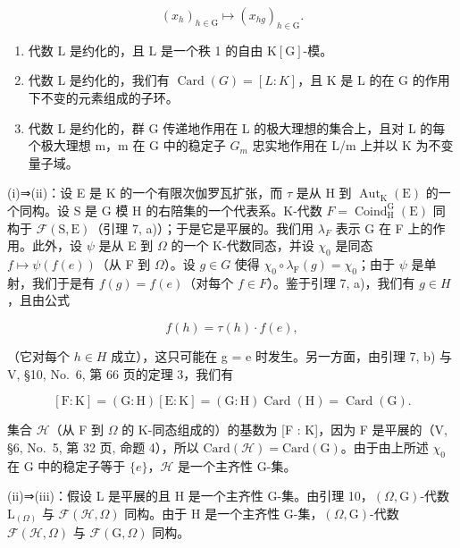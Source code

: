 \[
(x _ {h}) _ {h \in \mathrm{G}} \longmapsto (x _ {h g}) _ {h \in \mathrm{G}}.
\]

\begin{enumerate}
\def\labelenumi{(\roman{enumi})}
\setcounter{enumi}{3}
\item
  代数 \(\mathrm{L}\) 是约化的，且 \(\mathrm{L}\) 是一个秩 1 的自由 \(\mathrm{K}[\mathrm{G}]\)-模。
\item
  代数 L 是约化的，我们有 \(\operatorname{Card}(G) = [L : K]\)，且 K 是 L 的在 G 的作用下不变的元素组成的子环。
\item
  代数 L 是约化的，群 G 传递地作用在 L 的极大理想的集合上，且对 L 的每个极大理想 m，m 在 G 中的稳定子 \(G_{m}\) 忠实地作用在 L/m 上并以 K 为不变量子域。
\end{enumerate}

(i)⇒(ii)：设 E 是 K 的一个有限次伽罗瓦扩张，而 \(\tau\) 是从 H 到 \(\operatorname{Aut}_{\mathrm{K}}(\mathrm{E})\) 的一个同构。设 S 是 G 模 H 的右陪集的一个代表系。K-代数 \(F = \operatorname{Coind}_{\mathrm{H}}^{\mathrm{G}}(\mathrm{E})\) 同构于 \(\mathcal{F}(\mathrm{S}, \mathrm{E})\)（引理 7, a)）；于是它是平展的。我们用 \(\lambda_{F}\) 表示 G 在 F 上的作用。此外，设 \(\psi\) 是从 E 到 \(\Omega\) 的一个 K-代数同态，并设 \(\chi_{0}\) 是同态 \(f \mapsto \psi(f(e))\)（从 F 到 \(\Omega\)）。设 \(g \in G\) 使得 \(\chi_{0} \circ \lambda_{\mathrm{F}}(g) = \chi_{0}\)；由于 \(\psi\) 是单射，我们于是有 \(f(g) = f(e)\)（对每个 \(f \in F\)）。鉴于引理 7, a)，我们有 \(g \in H\)，且由公式

\[
f (h) = \tau (h) \cdot f (e),\tag{18}
\]

（它对每个 \(h \in H\) 成立），这只可能在 g = e 时发生。另一方面，由引理 7, b) 与 V, §10, No.~6, 第 66 页的定理 3，我们有

\[
[ \mathrm{F}: \mathrm{K} ] = (\mathrm{G}: \mathrm{H}) [ \mathrm{E}: \mathrm{K} ] = (\mathrm{G}: \mathrm{H}) \operatorname{Card} (\mathrm{H}) = \operatorname{Card} (\mathrm{G}).
\]

集合 \(\mathcal{H}\)（从 F 到 \(\Omega\) 的 K-同态组成的）的基数为 {[}F : K{]}，因为 F 是平展的（V, §6, No.~5, 第 32 页, 命题 4），所以 \(\mathrm{Card}(\mathcal{H}) = \mathrm{Card}(\mathrm{G})\)。由于由上所述 \(\chi_0\) 在 G 中的稳定子等于 \(\{e\}\)，\(\mathcal{H}\) 是一个主齐性 G-集。

(ii)⇒(iii)：假设 L 是平展的且 H 是一个主齐性 G-集。由引理 10，\((\Omega,\mathrm{G})\)-代数 \(\mathrm{L}_{(\Omega)}\) 与 \(\mathcal{F}(\mathcal{H},\Omega)\) 同构。由于 H 是一个主齐性 G-集，\((\Omega,\mathrm{G})\)-代数 \(\mathcal{F}(\mathcal{H},\Omega)\) 与 \(\mathcal{F}(\mathrm{G},\Omega)\) 同构。

